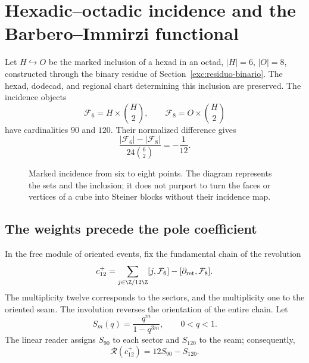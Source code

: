 \section{Hexadic--octadic incidence and the Barbero--Immirzi functional}
\label{v:ant:sec:barbero}
Let $H\hookrightarrow O$ be the marked inclusion of a hexad in an octad,
$|H|=6$, $|O|=8$, constructed through the binary residue of
Section~\ref{exc:residuo-binario}. The hexad, dodecad,
and regional chart determining this inclusion are preserved.
The incidence objects
\[
\mathcal F_6=H\times\binom H2,\qquad
\mathcal F_8=O\times\binom H2
\]
have cardinalities $90$ and $120$. Their normalized difference gives
\[
\frac{|\mathcal F_6|-|\mathcal F_8|}{24\binom62}=-\frac1{12}.
\]
\begin{figure}[htbp]
\centering
{}
\caption{Marked incidence from six to eight points. The diagram represents
the sets and the inclusion; it does not purport to turn the faces or vertices
of a cube into Steiner blocks without their incidence map.}
\end{figure}

\subsection{The weights precede the pole coefficient}
In the free module of oriented events, fix the fundamental
chain of the revolution
\[
c_{12}^{+}=
\sum_{j\in\Z/12\Z}[j,\mathcal F_6]
-[\partial_{\rm ret},\mathcal F_8].
\]
The multiplicity twelve corresponds to the sectors, and the multiplicity one
to the oriented seam. The involution reverses the orientation of the entire
chain. Let
\[
S_m(q)=\frac{q^m}{1-q^{3m}},\qquad 0<q<1.
\]
The linear reader assigns $S_{90}$ to each sector and $S_{120}$ to the seam;
consequently,
\[
\mathscr R(c_{12}^{+})=12S_{90}-S_{120}.
\]

